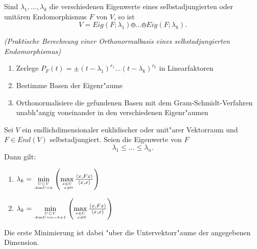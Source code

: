\documentclass[9pt, a4paper, twocolumn, landscape]{article}
\newcommand{\comment}[1]{}
\begin{document}
\comment{
\begin{theorem}
Ist \(F\) ein selbstadjungierter Endomorphismus eines euklidischen bzw. unitären endlichdimensionalen Vektorraumes, so gibt es eine Orthonormalbasis von \(V\), die aus Eigenvektoren von \(F\) besteht. Insbesondere ist $F$ also diagonalisierbar.
\end{theorem}


\begin{theorem}
Ist \(A \in \mathbb{M}(n \times n ; K)\) eine symmetrische bzw. hermitesche Matrix, so
gibt es eine orthogonale bzw. unitäre Matrix $S$, so dass
$$
S^\dagger A S = 
\left(\begin{array}{ccc}\lambda_{1} & & 0 
\\ & \ddots & 
\\ 0 & & \lambda_{n}\end{array}\right)
$$
mit $\lambda_1, ..., \lambda_n \in \mathbb{R}$.
\end{theorem}
}

\begin{corollary}
Sind \(\lambda_{1}, ..., \lambda_{k}\) die verschiedenen Eigenwerte eines selbstadjungierten oder unitären Endomorphismus \(F\) von \(V\), so ist
$$
V= Eig (F ; \lambda_{1}) \obot ... \obot Eig(F ; \lambda_{k}).
$$
\end{corollary}

\begin{remark} \textit{(Praktische Berechnung einer Orthonormalbasis eines selbstadjungierten Endomorphismus)}
\begin{enumerate}
\item Zerlege $P_F(t) = \pm (t- \lambda_1)^{r_1} ... (t- \lambda_k)^{r_k} $ in Linearfaktoren
\item Bestimme Basen der Eigenr"aume
\item Orthonormalisiere die gefundenen Basen mit dem Gram-Schmidt-Verfahren unabh"angig voneinander in den verschiedenen Eigenr"aumen
\end{enumerate}

\end{remark}

\begin{theorem} Sei $V$ ein endlichdimensionaler euklidischer oder unit"arer Vektorraum und $F \in End(V)$ selbstadjungiert. Seien die Eigenwerte von $F$ 
$$
\lambda_1 \leq ... \leq \lambda_n.
$$
Dann gilt:
\begin{enumerate}
\item $\lambda_k = \min\limits_{U\subset V \atop \mathrm{dim} U = k} \left(   \max\limits_{x\in U \atop \ x \neq 0} \frac{\left\langle {x} , {Fx} \right\rangle}{\left\langle {x} , {x} \right\rangle}\right)$
\item $\lambda_k = \min\limits_{U\subset V \atop \mathrm{dim} U = n - k + 1} \left(   \max\limits_{x\in U \atop \ x \neq 0} \frac{\left\langle {x} , {Fx} \right\rangle}{\left\langle {x} , {x} \right\rangle}\right)$
\end{enumerate}
Die erste Minimierung ist dabei "uber die Untervektorr"aume der angegebenen Dimension.
\end{theorem}
 
\end{document}
